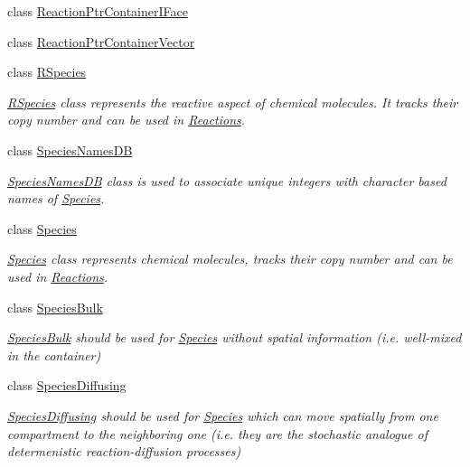 \begin{DoxyCompactItemize}
class \hyperlink{classchem_1_1ReactionPtrContainerIFace}{Reaction\-Ptr\-Container\-I\-Face}
\item 
class \hyperlink{classchem_1_1ReactionPtrContainerVector}{Reaction\-Ptr\-Container\-Vector}
\item 
class \hyperlink{classchem_1_1RSpecies}{R\-Species}
\begin{DoxyCompactList}\small\item\em \hyperlink{classchem_1_1RSpecies}{R\-Species} class represents the reactive aspect of chemical molecules. It tracks their copy number and can be used in \hyperlink{classchem_1_1Reaction}{Reactions}. \end{DoxyCompactList}\item 
class \hyperlink{classchem_1_1SpeciesNamesDB}{Species\-Names\-D\-B}
\begin{DoxyCompactList}\small\item\em \hyperlink{classchem_1_1SpeciesNamesDB}{Species\-Names\-D\-B} class is used to associate unique integers with character based names of \hyperlink{classchem_1_1Species}{Species}. \end{DoxyCompactList}\item 
class \hyperlink{classchem_1_1Species}{Species}
\begin{DoxyCompactList}\small\item\em \hyperlink{classchem_1_1Species}{Species} class represents chemical molecules, tracks their copy number and can be used in \hyperlink{classchem_1_1Reaction}{Reactions}. \end{DoxyCompactList}\item 
class \hyperlink{classchem_1_1SpeciesBulk}{Species\-Bulk}
\begin{DoxyCompactList}\small\item\em \hyperlink{classchem_1_1SpeciesBulk}{Species\-Bulk} should be used for \hyperlink{classchem_1_1Species}{Species} without spatial information (i.\-e. well-\/mixed in the container) \end{DoxyCompactList}\item 
class \hyperlink{classchem_1_1SpeciesDiffusing}{Species\-Diffusing}
\begin{DoxyCompactList}\small\item\em \hyperlink{classchem_1_1SpeciesDiffusing}{Species\-Diffusing} should be used for \hyperlink{classchem_1_1Species}{Species} which can move spatially from one compartment to the neighboring one (i.\-e. they are the stochastic analogue of determenistic reaction-\/diffusion processes) \end{DoxyCompactList}\item 

\end{DoxyCompactItemize}
